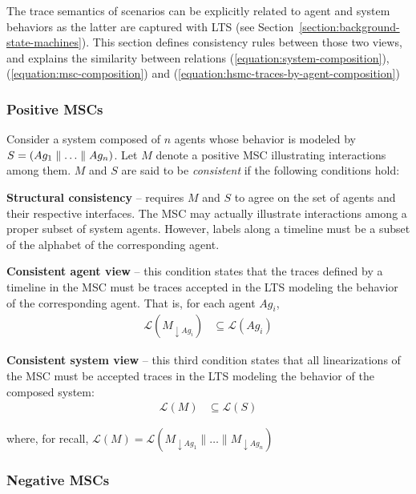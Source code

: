 The trace semantics of scenarios can be explicitly related to agent and system behaviors as the latter are captured with LTS (see Section~\ref{section:background-state-machines}). This section defines consistency rules between those two views, and explains the similarity between relations (\ref{equation:system-composition}), (\ref{equation:msc-composition}) and (\ref{equation:hsmc-traces-by-agent-composition})

\subsubsection*{Positive MSCs}

Consider a system composed of $n$ agents whose behavior is modeled by $S = (Ag_1 \parallel \ldots \parallel Ag_n)$. Let $M$ denote a positive MSC illustrating interactions among them. $M$ and $S$ are said to be \emph{consistent} if the following conditions hold:

\noindent \textbf{Structural consistency} -- requires $M$ and $S$ to agree on the set of agents and their respective interfaces. The MSC may actually illustrate interactions among a proper subset of system agents. However, labels along a timeline must be a subset of the alphabet of the corresponding agent.

\noindent \textbf{Consistent agent view} -- this condition states that the traces defined by a timeline in the MSC must be traces accepted in the LTS modeling the behavior of the corresponding agent. That is, for each agent $Ag_i$,
\begin{align}\mathcal{L}(M_{\downarrow Ag_i}) & \subseteq \mathcal{L}(Ag_i)\label{condition:consistent-agent-view}\end{align}

\noindent \textbf{Consistent system view} -- this third condition states that all linearizations of the MSC must be accepted traces in the LTS modeling the behavior of the composed system:
\begin{align}\mathcal{L}(M) & \subseteq \mathcal{L}(S)\label{condition:consistent-system-view}\end{align}

\noindent where, for recall, $\mathcal{L}(M) = \mathcal{L}(M_{\downarrow Ag_1} \parallel \ldots \parallel M_{\downarrow Ag_n})$

\subsubsection*{Negative MSCs}

